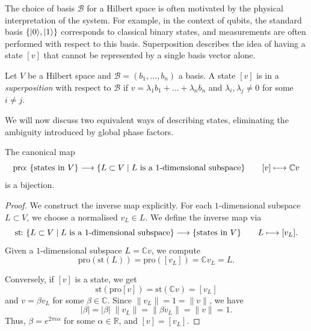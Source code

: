 \documentclass[a4paper, oneside, 12pt]{amsart}
\begin{document}
The choice of basis \(\mathcal{B}\) for a Hilbert space is often motivated by the physical interpretation of the system.
For example, in the context of qubits, the standard basis \( \{\lvert0\rangle, \lvert1\rangle\} \) corresponds to classical binary states, and measurements are often performed with respect to this basis.
Superposition describes the idea of having a state \([v]\) that cannot be represented by a single basis vector alone.

\begin{definition}\label{def:superposition}
  Let \(V\) be a Hilbert space and \(\mathcal{B}= (b_1, \dots, b_n)\) a basis.
  A state \([v]\) is in a \emph{superposition} with respect to \(\mathcal{B}\) if  \(v = \lambda_{1} b_{1} + \dots +\lambda_{n}b_{n}\) and \(\lambda_{i}, \lambda_{j}\neq 0\) for some \(i\neq j\).
\end{definition}

We will now discuss two equivalent ways of describing states, eliminating the ambiguity introduced by global phase factors.

\begin{lemma}\label{lem:projective-space-and-phases}
  The canonical map
  \begin{equation}
    \mathrm{pro} \from \{\text{states in } V\} \to\{L\subset V\mid L \text{ is a 1-dimensional subspace}\} \qquad
    [v]\mapsto \mathbb{C} v %
  \end{equation}
  is a bijection.
\end{lemma}
\begin{proof}
  We construct the inverse map explicitly.
  For each \(1\)-dimensional subspace \( L \subset V \), we choose a normalised  \( v_{L} \in L\).
  We define the inverse map via
  \begin{equation*}
    \mathrm{st} \from \{L\subset V\mid L \text{ is a 1-dimensional subspace}\} \to \{\text{states in } V\} \qquad L \mapsto [v_{L}].
  \end{equation*}
  Given a \(1\)-dimensional subspace \( L = \mathbb{C} v \), we compute
  \begin{equation*}
    \mathrm{pro}(\mathrm{st}(L)) = \mathrm{pro}([v_{L}]) = \mathbb{C}  v_{L} = L.
  \end{equation*}

  Conversely, if \([v]\) is a state, we get
  \begin{equation*}
    \mathrm{st}(\mathrm{pro}[v]) = \mathrm{st}( \mathbb{C} v) = [v_{L}]
  \end{equation*}
  and  \(v =\beta v_{L}\) for some \(\beta \in \mathbb{C}\).
  Since \( \|v_{L}\| = 1 = \|v\| \), we have
  \begin{equation*}
    |\beta| = |\beta| \;\|v_{L}\| = \|\beta v_{L}\| = \|v\| = 1.
  \end{equation*}
  Thus, \( \beta = e^{2\pi i \alpha} \) for some \( \alpha \in \mathbb{R} \), and \( [v] = [v_{L}]\).
\end{proof}
\end{document}
